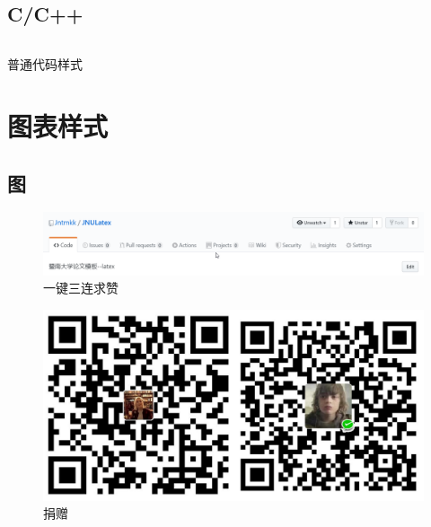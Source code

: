 \subsection{C/C++}
\inputminted[xleftmargin=2.5em,
    framexleftmargin=1.5em,
    bgcolor=lightgray!10,
    autogobble=true,
    numbers=left,
    frame=none,
    framesep=2mm,
    baselinestretch=1.2,
    breaklines=true]{c}{code/example.c}
\noindent 普通代码样式


\clearpage
\section[图表样式]{图表样式}
\subsection{图}
\lipsum[1]
\begin{figure}[htbp]
    \centering
    \includegraphics[width=\textwidth]{image/star.png}
    \caption{一键三连求赞}
\end{figure}
\begin{figure}[htbp]
    \centering
    \includegraphics[scale=.3]{image/donate.jpg}
    \caption{捐赠}
\end{figure}
\lipsum[2]

